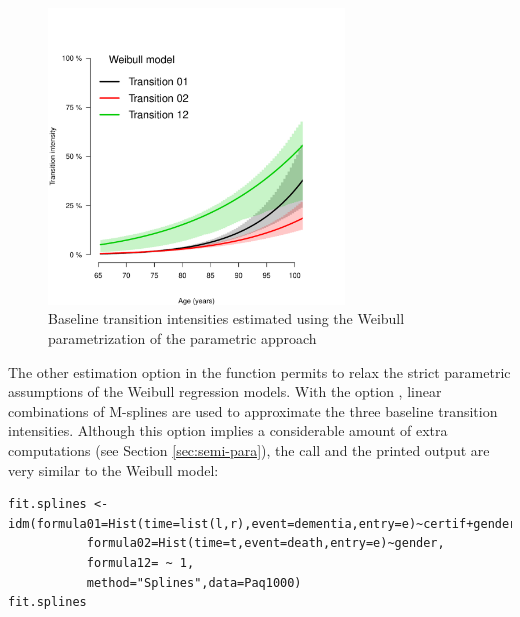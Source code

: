 \documentclass[article]{jss}
\begin{document}
\begin{figure}[htb]
\centering
\includegraphics[width=0.7\textwidth]{transition-intensities-paq-weib.pdf}
\caption{\label{fig:alpha_weib}Baseline transition intensities estimated using the Weibull parametrization of the parametric approach}
\end{figure}

\bigskip

The other estimation option in the function  permits to
relax the strict parametric assumptions of the Weibull regression
models. With the option , 
linear combinations of M-splines are
used to approximate the three baseline transition
intensities. Although this option implies a considerable amount of
extra computations (see Section \ref{sec:semi-para}), the call and the printed output are
very similar to the Weibull model:

\lstset{language=R,label= ,caption= ,numbers=none}
\begin{lstlisting}
fit.splines <- idm(formula01=Hist(time=list(l,r),event=dementia,entry=e)~certif+gender,
		   formula02=Hist(time=t,event=death,entry=e)~gender,
		   formula12= ~ 1,
		   method="Splines",data=Paq1000)
fit.splines
\end{lstlisting}
\end{document}
